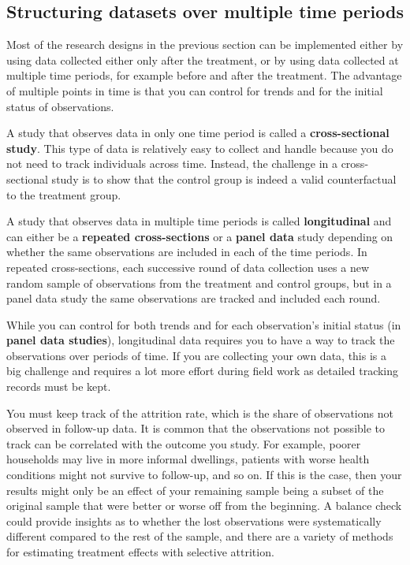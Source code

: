 \subsection{Structuring datasets over multiple time periods}

Most of the research designs in the previous section can be implemented
either by using data collected either only after the treatment,
or by using data collected at multiple time periods,
for example before and after the treatment.
The advantage of multiple points in time is
that you can control for trends and for the initial status of observations.

A study that observes data in only one time period is called
a \textbf{cross-sectional study}.
This type of data is relatively easy to collect and handle because
you do not need to track individuals across time.
Instead, the challenge in a cross-sectional study is to
show that the control group is indeed a valid counterfactual to the treatment group.

A study that observes data in multiple time periods is called \textbf{longitudinal} and
can either be a \textbf{repeated cross-sections} or a \textbf{panel data} study
  
depending on whether the same observations are included in each of the time periods.
In repeated cross-sections,
each successive round of data collection uses a new random sample
of observations from the treatment and control groups,
but in a panel data study the same observations are tracked and included each round.

While you can control for both trends
and for each observation's initial status (in \textbf{panel data studies}),
longitudinal data requires you
to have a way to track the observations over periods of time.
If you are collecting your own data, this is a big challenge
and requires a lot more effort during field work
as detailed tracking records must be kept.

You must keep track of the attrition rate,
which is the share of observations not observed in follow-up data.
It is common that the observations not possible to track
can be correlated with the outcome you study.
For example, poorer households may live in more informal dwellings,
patients with worse health conditions might not survive to follow-up,
and so on.
If this is the case, then your results might only be an effect of your remaining sample
being a subset of the original sample that were better or worse off from the beginning.
A balance check could provide insights
as to whether the lost observations were systematically different
compared to the rest of the sample,
and there are a variety of methods for estimating treatment effects
with selective attrition.

